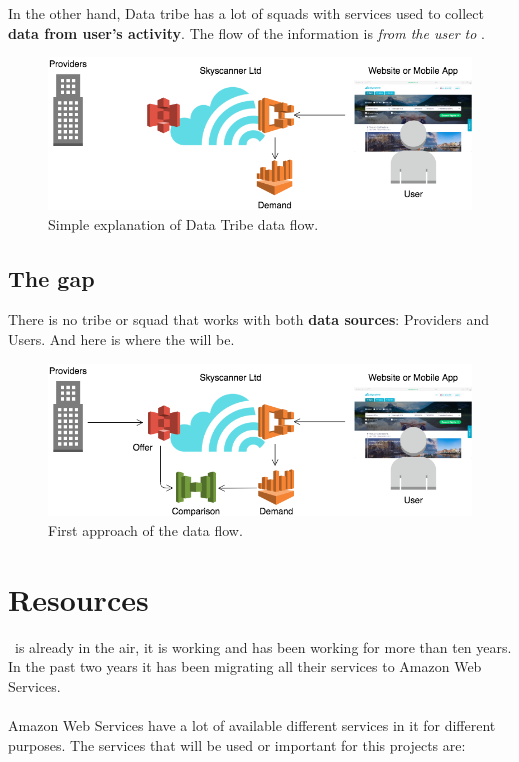 In the other hand, Data tribe has a lot of squads with services used to collect \textbf{data from user's activity}. The flow of the information is \textit{from the user to \company}.

\begin{figure}[H]
\centering
\includegraphics[scale=0.45]{diagrams/state-of-the-art-tribes-data-tribe.png}
\caption{Simple explanation of Data Tribe data flow.}
\end{figure}

\subsection{The gap}

There is no tribe or squad that works with both \textbf{data sources}: Providers and Users. And here is where the \textit{\thesistitle} will be.

\begin{figure}[H]
\centering
\includegraphics[scale=0.45]{diagrams/state-of-the-art-tribes-comparison.png}
\caption{First approach of the \thesis data flow.}
\end{figure}


\section{Resources} \label{resources}

\company\ is already in the air, it is working and has been working for more than ten years. In the past two years it has been migrating all their services to Amazon Web Services\cite{aws}.
\\\\
Amazon Web Services have a lot of available different services in it for different purposes. The services that will be used or important for this projects are:


